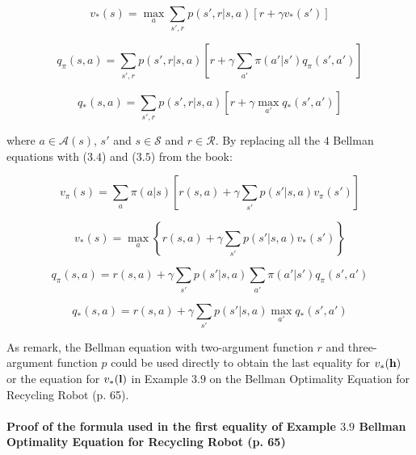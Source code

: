 \documentclass[10pt,a4paper]{article}
\begin{document}
\begin{equation}
v_*(s) = \max_{a} \sum_{s', r} p(s', r \lvert s, a) \left[r + \gamma v_*(s')\right]
\end{equation}

\begin{equation}
q_\pi(s, a) = \sum_{s', r} p(s', r \lvert s, a) \left[r + \gamma \sum_{a'} \pi(a' \lvert s') q_\pi(s', a')\right]
\end{equation}

\begin{equation}
q_*(s, a) = \sum_{s', r} p(s', r \lvert s, a) \left[r + \gamma \max_{a'} q_*(s', a')\right]
\end{equation}


where $a \in \mathcal{A}(s)$, $s'$ and $s \in \mathcal{S}$ and $r \in \mathcal{R}$. By replacing all the $4$ Bellman equations with ($3.4$) and ($3.5$) from the book:

\begin{equation}
v_\pi(s) = \sum_{a} \pi(a \lvert s) \left[ r(s, a) + \gamma \sum_{s'} p(s' \lvert s, a) v_\pi(s')\right]
\end{equation}

\begin{equation}
v_*(s) = \max_{a} \left\{ r(s, a) + \gamma \sum_{s'} p(s' \lvert s, a) v_*(s') \right\}
\end{equation}


\begin{equation}
q_\pi(s, a) = r(s, a) + \gamma \sum_{s'} p(s' \lvert s, a) \sum_{a'} \pi(a' \lvert s') q_\pi(s', a')
\end{equation}

\begin{equation}
q_*(s, a) = r(s, a) + \gamma \sum_{s'} p(s' \lvert s, a) \max_{a'} q_*(s', a')
\end{equation}

As remark, the Bellman equation with two-argument function $r$ and three-argument  function $p$ could be used directly to obtain the last equality for $v_*(\textrm{\textbf{h}})$ or the equation for $v_*(\textrm{\textbf{l}})$ in Example $3.9$ on the Bellman Optimality Equation for Recycling Robot (p. 65).

\paragraph{Proof of the formula used in the first equality of Example $3.9$ Bellman Optimality Equation for Recycling Robot (p. 65)}
\end{document}
